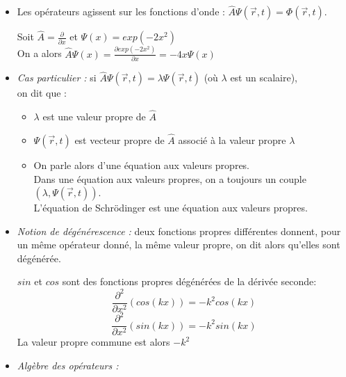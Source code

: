 \documentclass[../main.tex]{subfile}
\begin{document}
\begin{itemize}

   \item Les opérateurs agissent sur les fonctions d'onde : $\hat{A} \Psi(\vec{r}, t) = \Phi(\vec{r}, t)$.\\
  \begin{ex} 
     Soit $\hat{A} = \frac{\partial}{\partial x}$ et $\Psi(x) = exp(-2x^2)$\\
     On a alors $ \hat{A} \Psi(x) = \frac{\partial exp(-2x^2)}{\partial x} = -4x \Psi(x)$
  \end{ex}

  \item \emph{Cas particulier :} si $\hat{A} \Psi(\vec{r}, t) = \lambda \Psi(\vec{r}, t)$ (où $\lambda$ est un scalaire),\\
     on dit que : 
   
      \begin{itemize} 
               \item $\lambda$ est une valeur propre de $\hat{A}$
               \item $\Psi(\vec{r}, t)$ est vecteur propre de $\hat{A}$ associé à la valeur propre $\lambda$
               \item On parle alors d'une équation aux valeurs propres.\\
                  Dans une équation aux valeurs propres, on a toujours un couple $(\lambda, \Psi(\vec{r}, t))$.\\
                  L'équation de Schrödinger est une équation aux valeurs propres.
      \end{itemize}

   \item \emph{Notion de dégénérescence :} deux fonctions propres différentes donnent, pour un même opérateur donné, la même valeur propre, on dit alors qu'elles sont dégénérée.
      \begin{ex} 
            $sin$ et $cos$ sont des fonctions propres dégénérées de la dérivée seconde:
            $$\frac{\partial^2}{\partial x^2}(cos(kx)) = -k^2 cos(kx)$$
            $$\frac{\partial^2}{\partial x^2}(sin(kx)) = -k^2 sin(kx)$$
            La valeur propre commune est alors $-k^2$

      \end{ex}

   \item \emph{Algèbre des opérateurs :}


\end{itemize}
\end{document}
